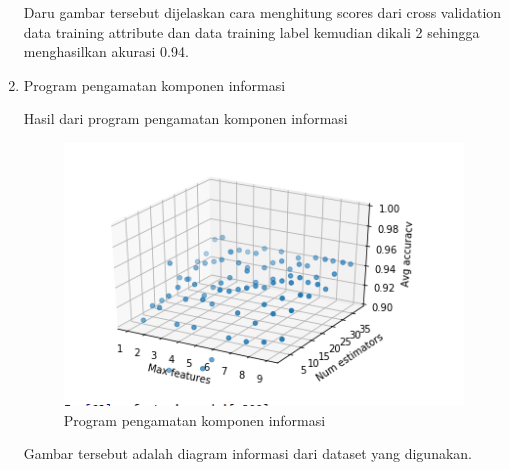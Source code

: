 \begin{enumerate}
	\par Daru gambar tersebut dijelaskan cara menghitung scores dari cross validation data training attribute dan data training label kemudian dikali 2 sehingga menghasilkan akurasi 0.94.
	
\item Program pengamatan komponen informasi
	\par  Hasil dari program pengamatan komponen informasi
		\begin{figure}[ht]
		\centering
		\includegraphics[scale=0.5]{figures/AFS/n11.png}
		\caption{Program pengamatan komponen informasi}
		\label{contoh}
		\end{figure}
		
	\par Gambar tersebut adalah diagram informasi dari dataset yang digunakan.

\end{enumerate}

